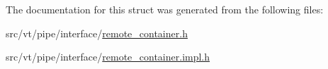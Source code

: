The documentation for this struct was generated from the following files\+:\begin{DoxyCompactItemize}
\item 
src/vt/pipe/interface/\hyperlink{remote__container_8h}{remote\+\_\+container.\+h}\item 
src/vt/pipe/interface/\hyperlink{remote__container_8impl_8h}{remote\+\_\+container.\+impl.\+h}\end{DoxyCompactItemize}
